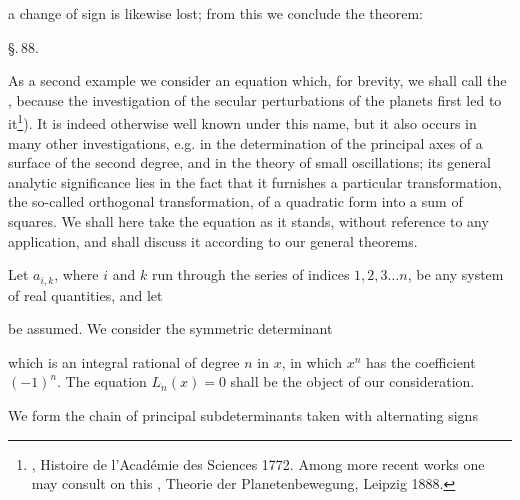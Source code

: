 a change of sign is likewise lost; from this we conclude the theorem:


\begin{center}
\S.\,88.

\end{center}

As a second example we consider an equation which, for brevity, we shall call the , because the investigation of the secular perturbations of the planets first led to it\footnote{, Histoire de l'Acad\'emie des Sciences 1772. Among more recent works one may consult on this , Theorie der Planetenbewegung, Leipzig 1888.}). It is indeed otherwise well known under this name, but it also occurs in many other investigations, e.g. in the determination of the principal axes of a surface of the second degree, and in the theory of small oscillations; its general analytic significance lies in the fact that it furnishes a particular transformation, the so-called orthogonal transformation, of a quadratic form into a sum of squares. We shall here take the equation as it stands, without reference to any application, and shall discuss it according to our general theorems.

Let $a_{i,k}$, where $i$ and $k$ run through the series of indices $1, 2, 3 \ldots n$, be any system of real quantities, and let


be assumed. We consider the symmetric determinant


which is an integral rational  of degree $n$ in $x$, in which $x^n$ has the coefficient $(-1)^n$. The equation $L_n(x)=0$ shall be the object of our consideration.

We form the chain of principal subdeterminants taken with alternating signs

